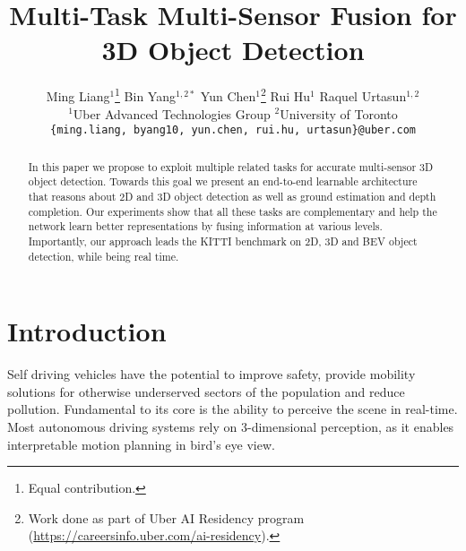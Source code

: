 \documentclass[10pt,twocolumn,letterpaper]{article}
\begin{document}
\title{Multi-Task Multi-Sensor Fusion for 3D Object Detection}

\author{
  Ming Liang$^{1}$\thanks{Equal contribution.} \quad Bin Yang$^{1,2 *}$ \quad Yun Chen$^{1}$\thanks{Work done as part of Uber AI Residency program (\url{https://careersinfo.uber.com/ai-residency}).} \quad Rui Hu$^{1}$ \quad Raquel Urtasun$^{1,2}$\\
  $^{1}$Uber Advanced Technologies Group \quad $^{2}$University of Toronto\\
  \small\texttt{\{ming.liang, byang10, yun.chen, rui.hu, urtasun\}@uber.com}
}

\maketitle


\begin{abstract}

In this paper we propose to exploit multiple related tasks for accurate  multi-sensor 3D object detection. Towards this goal we present an end-to-end learnable architecture that reasons about 2D and 3D object detection as well as ground estimation and depth completion. 
Our experiments show that all these tasks are complementary  and help the network learn better representations by fusing information at various levels. 
Importantly, our approach leads the KITTI benchmark on 2D, 3D and BEV object detection, while being real time.  

\end{abstract} \section{Introduction}

Self driving vehicles have the potential to  improve safety, provide mobility solutions for otherwise underserved sectors of the population and reduce pollution.  Fundamental to its core is the ability to perceive the scene in real-time. Most autonomous driving systems rely on 3-dimensional perception, as it enables interpretable motion planning in bird's eye view.   
\end{document}
